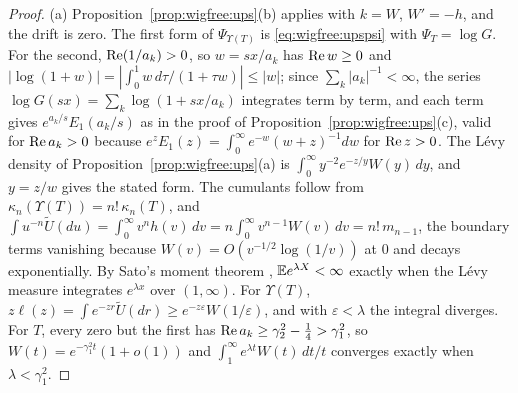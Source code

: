 \begin{proof}
(a) Proposition~\ref{prop:wigfree:ups}(b) applies with $k=W$, $W'=-h$, and the drift is zero. The first form of $\Psi_{\Upsilon(T)}$ is \eqref{eq:wigfree:upspsi} with $\Psi_T=\log G$. For the second, $\operatorname{Re}(1/a_k)>0$, so $w=sx/a_k$ has $\operatorname{Re} w\ge0$ and $|\log(1+w)|=|\int_0^1w\,d\tau/(1+\tau w)|\le|w|$; since $\sum_k|a_k|^{-1}<\infty$, the series $\log G(sx)=\sum_k\log(1+sx/a_k)$ integrates term by term, and each term gives $e^{a_k/s}E_1(a_k/s)$ as in the proof of Proposition~\ref{prop:wigfree:ups}(c), valid for $\operatorname{Re} a_k>0$ because $e^zE_1(z)=\int_0^\infty e^{-w}(w+z)^{-1}dw$ for $\operatorname{Re} z>0$. The L\'evy density of Proposition~\ref{prop:wigfree:ups}(a) is $\int_0^\infty y^{-2}e^{-z/y}W(y)\,dy$, and $y=z/w$ gives the stated form. The cumulants follow from $\kappa_n(\Upsilon(T))=n!\,\kappa_n(T)$, and $\int u^{-n}\widetilde U(du)=\int_0^\infty v^nh(v)\,dv=n\int_0^\infty v^{n-1}W(v)\,dv=n!\,m_{n-1}$, the boundary terms vanishing because $W(v)=O(v^{-1/2}\log(1/v))$ at $0$ and decays exponentially. By Sato's moment theorem \cite[Theorem 25.17]{Sato99}, $\mathbb{E} e^{\lambda X}<\infty$ exactly when the L\'evy measure integrates $e^{\lambda x}$ over $(1,\infty)$. For $\Upsilon(T)$, $z\ell(z)=\int e^{-zr}\widetilde U(dr)\ge e^{-z\varepsilon}W(1/\varepsilon)$, and with $\varepsilon<\lambda$ the integral diverges. For $T$, every zero but the first has $\operatorname{Re} a_k\ge\gamma_2^2-\frac14>\gamma_1^2$, so $W(t)=e^{-\gamma_1^2t}(1+o(1))$ and $\int_1^\infty e^{\lambda t}W(t)\,dt/t$ converges exactly when $\lambda<\gamma_1^2$.


\end{proof}
